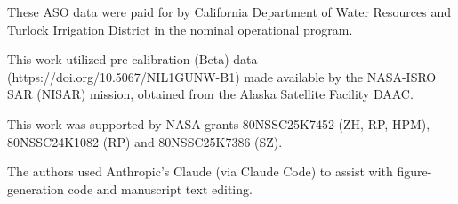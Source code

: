 \documentclass[tc, manuscript]{copernicus}
\begin{document}
\noappendix       %












\begin{acknowledgements}
These ASO data were paid for by California Department of Water Resources and Turlock Irrigation District in the nominal operational program.

This work utilized pre-calibration (Beta) data (https://doi.org/10.5067/NIL1GUNW-B1) made available by the NASA-ISRO SAR (NISAR) mission, obtained from the Alaska Satellite Facility DAAC.

This work was supported by NASA grants 80NSSC25K7452 (ZH, RP, HPM), 80NSSC24K1082 (RP) and 80NSSC25K7386 (SZ).

The authors used Anthropic's Claude (via Claude Code) to assist with figure-generation code and manuscript text editing.
\end{acknowledgements}



\end{document}

